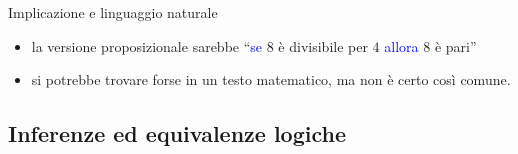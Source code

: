 \documentclass[aspectratio=169,10pt]{beamer}
\newcommand{\conn}[1]{\textcolor{blue}{#1}}
\begin{document}
\begin{frame}[fragile]{Implicazione e linguaggio naturale}
\begin{example}
\begin{itemize}
\begin{itemize}
            \item la versione proposizionale sarebbe ``\conn{se} 8 è divisibile per $4$ \conn{allora} $8$ è pari'' 
            \item si potrebbe trovare forse in un testo matematico, ma non è certo così comune.
        \end{itemize}
        \end{itemize}
    \end{example}
\end{frame}

\subsection{Inferenze ed equivalenze logiche}
\end{document}
